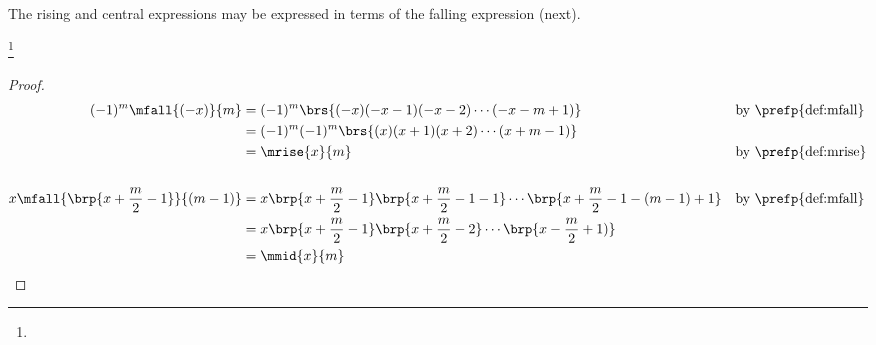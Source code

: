 The rising and central expressions may be expressed in terms of the falling expression (next).
\begin{proposition}
\footnote{
  }
\label{prop:mfall}
\end{proposition}
\begin{proof}
  \begin{align*}
    (-1)^m\mfall{(-x)}{m}
      &= (-1)^m\brs{(-x)(-x-1)(-x-2)\cdots(-x-m+1)}
      && \text{by \prefp{def:mfall}}
    \\&= (-1)^m(-1)^m\brs{(x)(x+1)(x+2)\cdots(x+m-1)}
    \\&= \mrise{x}{m}
      && \text{by \prefp{def:mrise}}
    \\\\
    x\mfall{\brp{x+\frac{m}{2}-1}}{(m-1)}
      &= x\brp{x+\frac{m}{2}-1}\brp{x+\frac{m}{2}-1-1}\cdots\brp{x+\frac{m}{2}-1-(m-1)+1}
      && \text{by \prefp{def:mfall}}
    \\&= x\brp{x+\frac{m}{2}-1}\brp{x+\frac{m}{2}-2}\cdots\brp{x-\frac{m}{2}+1)}
    \\&= \mmid{x}{m}
  \end{align*}
\end{proof}

